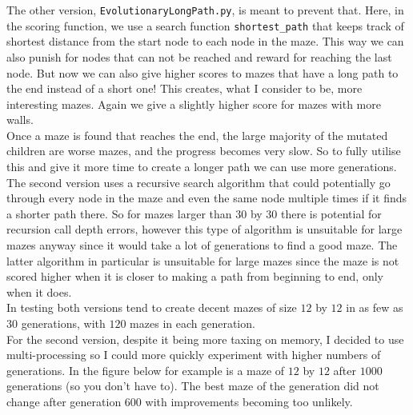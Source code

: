 \documentclass[10pt, a4paper, twoside]{amsart}
\newcommand{\1}{\mathbbm{1}}
\begin{document}
The other version, \verb+EvolutionaryLongPath.py+, is meant to prevent that. Here, in the scoring function, we use a search function \verb+shortest_path+ that keeps track of shortest distance from the start node to each node in the maze. This way we can also punish for nodes that can not be reached and reward for reaching the last node. But now we can also give higher scores to mazes that have a long path to the end instead of a short one! This creates, what I consider to be, more interesting mazes. Again we give a slightly higher score for mazes with more walls.\\

Once a maze is found that reaches the end, the large majority of the mutated children are worse mazes, and the progress becomes very slow. So to fully utilise this and give it more time to create a longer path we can use more generations.\\

The second version uses a recursive search algorithm that could potentially go through every node in the maze and even the same node multiple times if it finds a shorter path there. So for mazes larger than $30$ by $30$ there is potential for recursion call depth errors, however this type of algorithm is unsuitable for large mazes anyway since it would take a lot of generations to find a good maze. The latter algorithm in particular is unsuitable for large mazes since the maze is not scored higher when it is closer to making a path from beginning to end, only when it does.\\

In testing both versions tend to create decent mazes of size $12$ by $12$ in as few as $30$ generations, with $120$ mazes in each generation.\\

For the second version, despite it being more taxing on memory, I decided to use multi-processing so I could more quickly experiment with higher numbers of generations. In the figure below for example is a maze of $12$ by $12$ after $1000$ generations (so you don't have to). The best maze of the generation did not change after generation $600$ with improvements becoming too unlikely.
\end{document}
